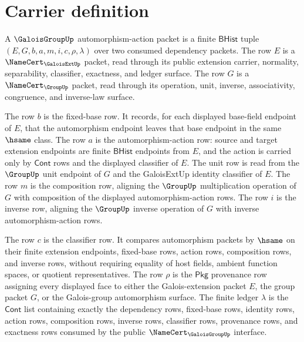 \section{Carrier definition}
\label{sec:galoisgroup-carrier}

\begin{definition}
\label{def:galoisgroup-bhist-automorphism-action-packet}
A $\GaloisGroupUp$ automorphism-action packet is a finite $\mathsf{BHist}$
tuple $(E,G,b,a,m,i,c,\rho,\lambda)$ over two consumed dependency packets. The
row $E$ is a $\NameCert_{\GaloisExtUp}$ packet, read through its public
extension carrier, normality, separability, classifier, exactness, and ledger
surface. The row $G$ is a $\NameCert_{\GroupUp}$ packet, read through its
operation, unit, inverse, associativity, congruence, and inverse-law surface.

The row $b$ is the fixed-base row. It records, for each displayed base-field
endpoint of $E$, that the automorphism endpoint leaves that base endpoint in
the same $\hsame$ class. The row $a$ is the automorphism-action row: source
and target extension endpoints are finite $\mathsf{BHist}$ endpoints from
$E$, and the action is carried only by $\mathsf{Cont}$ rows and the displayed
classifier of $E$. The unit row is read from the $\GroupUp$ unit endpoint of
$G$ and the GaloisExtUp identity classifier of $E$. The row $m$ is the
composition row, aligning the $\GroupUp$ multiplication operation of $G$ with
composition of the displayed automorphism-action rows. The row $i$ is the
inverse row, aligning the $\GroupUp$ inverse operation of $G$ with inverse
automorphism-action rows.

The row $c$ is the classifier row. It compares automorphism packets by
$\hsame$ on their finite extension endpoints, fixed-base rows, action rows,
composition rows, and inverse rows, without requiring equality of host fields,
ambient function spaces, or quotient representatives. The row $\rho$ is the
$\mathsf{Pkg}$ provenance row assigning every displayed face to either the
Galois-extension packet $E$, the group packet $G$, or the Galois-group
automorphism surface. The finite ledger $\lambda$ is the $\mathsf{Cont}$ list
containing exactly the dependency rows, fixed-base rows, identity rows, action
rows, composition rows, inverse rows, classifier rows, provenance rows, and
exactness rows consumed by the public $\NameCert_{\GaloisGroupUp}$ interface.
\end{definition}

